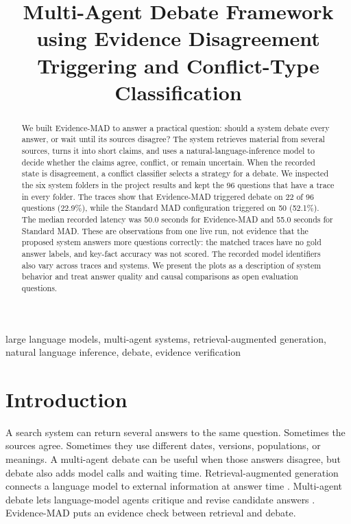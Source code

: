 \documentclass[conference]{IEEEtran}
\begin{document}
\title{Multi-Agent Debate Framework using Evidence Disagreement Triggering and Conflict-Type Classification}

\author{
\vspace{0.8em}
}
\maketitle

\begin{abstract}
We built Evidence-MAD to answer a practical question: should a system debate every answer, or wait until its sources disagree? The system retrieves material from several sources, turns it into short claims, and uses a natural-language-inference model to decide whether the claims agree, conflict, or remain uncertain. When the recorded state is disagreement, a conflict classifier selects a strategy for a debate. We inspected the six system folders in the project results and kept the 96 questions that have a trace in every folder. The traces show that Evidence-MAD triggered debate on 22 of 96 questions (22.9\%), while the Standard MAD configuration triggered on 50 (52.1\%). The median recorded latency was 50.0 seconds for Evidence-MAD and 55.0 seconds for Standard MAD. These are observations from one live run, not evidence that the proposed system answers more questions correctly: the matched traces have no gold answer labels, and key-fact accuracy was not scored. The recorded model identifiers also vary across traces and systems. We present the plots as a description of system behavior and treat answer quality and causal comparisons as open evaluation questions.
\end{abstract}

\begin{IEEEkeywords}
large language models, multi-agent systems, retrieval-augmented generation, natural language inference, debate, evidence verification
\end{IEEEkeywords}

\section{Introduction}
A search system can return several answers to the same question. Sometimes the sources agree. Sometimes they use different dates, versions, populations, or meanings. A multi-agent debate can be useful when those answers disagree, but debate also adds model calls and waiting time. Retrieval-augmented generation connects a language model to external information at answer time \cite{lewis2020rag}. Multi-agent debate lets language-model agents critique and revise candidate answers \cite{du2024icml}. Evidence-MAD puts an evidence check between retrieval and debate.
\end{document}
